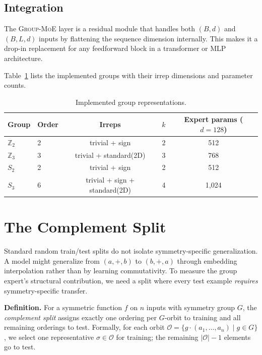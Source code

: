 \documentclass[10pt, letterpaper]{article}
\newcommand{\gmoe}{\textsc{Group-MoE}}
\begin{document}
\subsection{Integration}

The \gmoe{} layer is a residual module that handles both $(B, d)$ and $(B, L, d)$ inputs by flattening the sequence dimension internally. This makes it a drop-in replacement for any feedforward block in a transformer or MLP architecture.

Table~\ref{tab:groups} lists the implemented groups with their irrep dimensions and parameter counts.

\begin{table}[h]
\centering
\caption{Implemented group representations.}
\label{tab:groups}
\begin{tabular}{llccc}
\toprule
Group & Order & Irreps & $k$ & Expert params ($d{=}128$) \\
\midrule
$\mathbb{Z}_2$ & 2 & trivial + sign & 2 & 512 \\
$\mathbb{Z}_3$ & 3 & trivial + standard(2D) & 3 & 768 \\
$S_2$ & 2 & trivial + sign & 2 & 512 \\
$S_3$ & 6 & trivial + sign + standard(2D) & 4 & 1,024 \\
\bottomrule
\end{tabular}
\end{table}

\section{The Complement Split}
\label{sec:complement}

Standard random train/test splits do not isolate symmetry-specific generalization. A model might generalize from $(a, +, b)$ to $(b, +, a)$ through embedding interpolation rather than by learning commutativity. To measure the group expert's structural contribution, we need a split where every test example \emph{requires} symmetry-specific transfer.

\textbf{Definition.} For a symmetric function $f$ on $n$ inputs with symmetry group $G$, the \emph{complement split} assigns exactly one ordering per $G$-orbit to training and all remaining orderings to test. Formally, for each orbit $\mathcal{O} = \{g \cdot (a_1, \ldots, a_n) \mid g \in G\}$, we select one representative $\sigma \in \mathcal{O}$ for training; the remaining $|\mathcal{O}| - 1$ elements go to test.
\end{document}
